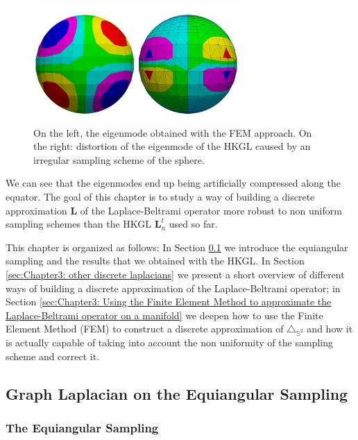 \begin{figure}[h]
	\begin{center}
		\includegraphics[width=0.7\textwidth]{../codes/04.imbalanced/img/confront_mixed.png}
	\end{center}
	\caption{\label{fig:equiangular distortion}On the left, the eigenmode obtained with the FEM approach. On the right: distortion of the eigenmode of the HKGL caused by an irregular sampling scheme of the sphere.}
\end{figure}
We can see that the eigenmodes end up being artificially compressed along the equator.
The goal of this chapter is to study a way of building a discrete approximation $\mathbf L$ of the Laplace-Beltrami operator more robust to non uniform sampling schemes than the HKGL $\mathbf L_n^t$ used so far.

This chapter is organized as follows: In Section \ref{sec:Chapter3: Heat Kernel Graph Laplacian on the Equiangular Sampling} we introduce the equiangular sampling and the results that we obtained with the HKGL. In Section \ref{sec:Chapter3: other discrete laplacians} we present a short overview of different ways of building a discrete approximation of the Laplace-Beltrami operator; in Section \ref{sec:Chapter3: Using the Finite Element Method to approximate the Laplace-Beltrami operator on a manifold} we deepen how to use the Finite Element Method (FEM) to construct a discrete approximation of $\triangle_{\mathbb S^2}$ and how it is actually capable of taking into account the non uniformity of the sampling scheme and correct it.
\subsection{Graph Laplacian on the Equiangular Sampling}
\label{sec:Chapter3: Heat Kernel Graph Laplacian on the Equiangular Sampling}

\subsubsection{The Equiangular Sampling}

